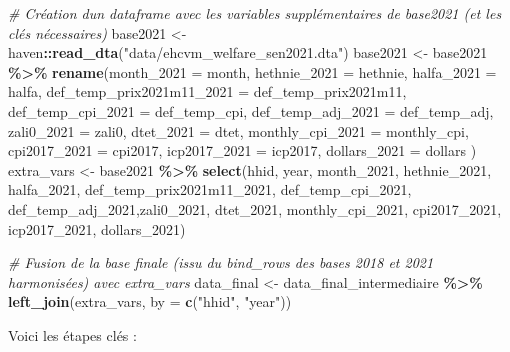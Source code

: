\documentclass[
]{article}
\newenvironment{Shaded}{\begin{snugshade}}{\end{snugshade}}
\newcommand{\AttributeTok}[1]{\textcolor[rgb]{0.13,0.29,0.53}{#1}}
\newcommand{\CommentTok}[1]{\textcolor[rgb]{0.56,0.35,0.01}{\textit{#1}}}
\newcommand{\FunctionTok}[1]{\textcolor[rgb]{0.13,0.29,0.53}{\textbf{#1}}}
\newcommand{\NormalTok}[1]{#1}
\newcommand{\OtherTok}[1]{\textcolor[rgb]{0.56,0.35,0.01}{#1}}
\newcommand{\SpecialCharTok}[1]{\textcolor[rgb]{0.81,0.36,0.00}{\textbf{#1}}}
\newcommand{\StringTok}[1]{\textcolor[rgb]{0.31,0.60,0.02}{#1}}
\begin{document}
\begin{Shaded}
\begin{Highlighting}[]
\CommentTok{\# Création d\textquotesingle{}un dataframe avec les variables supplémentaires de base2021 (et les clés nécessaires)}
\NormalTok{base2021 }\OtherTok{\textless{}{-}}\NormalTok{ haven}\SpecialCharTok{::}\FunctionTok{read\_dta}\NormalTok{(}\StringTok{"data/ehcvm\_welfare\_sen2021.dta"}\NormalTok{)}
\NormalTok{base2021 }\OtherTok{\textless{}{-}}\NormalTok{ base2021 }\SpecialCharTok{\%\textgreater{}\%} 
  \FunctionTok{rename}\NormalTok{(}\AttributeTok{month\_2021 =}\NormalTok{ month,}
         \AttributeTok{hethnie\_2021 =}\NormalTok{ hethnie,}
         \AttributeTok{halfa\_2021 =}\NormalTok{ halfa,}
         \AttributeTok{def\_temp\_prix2021m11\_2021 =}\NormalTok{ def\_temp\_prix2021m11,}
         \AttributeTok{def\_temp\_cpi\_2021 =}\NormalTok{ def\_temp\_cpi,}
         \AttributeTok{def\_temp\_adj\_2021 =}\NormalTok{ def\_temp\_adj,}
         \AttributeTok{zali0\_2021 =}\NormalTok{ zali0,}
         \AttributeTok{dtet\_2021 =}\NormalTok{ dtet,}
         \AttributeTok{monthly\_cpi\_2021 =}\NormalTok{ monthly\_cpi,}
         \AttributeTok{cpi2017\_2021 =}\NormalTok{ cpi2017,}
         \AttributeTok{icp2017\_2021 =}\NormalTok{ icp2017,}
         \AttributeTok{dollars\_2021 =}\NormalTok{ dollars}
\NormalTok{         )}
\NormalTok{extra\_vars }\OtherTok{\textless{}{-}}\NormalTok{ base2021 }\SpecialCharTok{\%\textgreater{}\%} 
  \FunctionTok{select}\NormalTok{(hhid, year, month\_2021, hethnie\_2021, halfa\_2021, }
\NormalTok{         def\_temp\_prix2021m11\_2021, def\_temp\_cpi\_2021, }
\NormalTok{         def\_temp\_adj\_2021,zali0\_2021, dtet\_2021, }
\NormalTok{         monthly\_cpi\_2021, cpi2017\_2021, icp2017\_2021, dollars\_2021)}

\CommentTok{\# Fusion de la base finale (issu du bind\_rows des bases 2018 et 2021 harmonisées) avec extra\_vars}
\NormalTok{data\_final }\OtherTok{\textless{}{-}}\NormalTok{ data\_final\_intermediaire }\SpecialCharTok{\%\textgreater{}\%} 
  \FunctionTok{left\_join}\NormalTok{(extra\_vars, }\AttributeTok{by =} \FunctionTok{c}\NormalTok{(}\StringTok{"hhid"}\NormalTok{, }\StringTok{"year"}\NormalTok{))}
\end{Highlighting}
\end{Shaded}

Voici les étapes clés :
\end{document}
